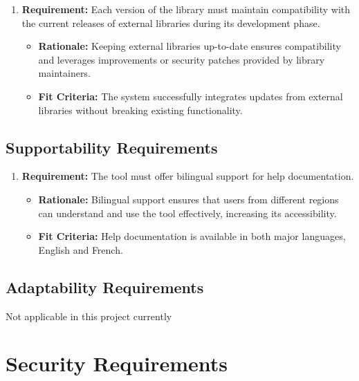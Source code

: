 \documentclass[12pt]{article}
\begin{document}
\begin{enumerate}
  \item \textbf{Requirement:} Each version of the library must maintain compatibility with the current releases of external libraries during its development phase.
     \begin{itemize}
         \item \textbf{Rationale:} Keeping external libraries up-to-date ensures compatibility and leverages improvements or security patches provided by library maintainers.
         \item \textbf{Fit Criteria:} The system successfully integrates updates from external libraries without breaking existing functionality.
     \end{itemize}
  
  \end{enumerate}

\subsection{Supportability Requirements}
\begin{enumerate}
  \item \textbf{Requirement:} The tool must offer bilingual support for help documentation.
  \begin{itemize}
      \item \textbf{Rationale:} Bilingual support ensures that users from different regions can understand and use the tool effectively, increasing its accessibility.
      \item \textbf{Fit Criteria:} Help documentation is available in both major languages, English and French.
  \end{itemize}
  
\end{enumerate}

\subsection{Adaptability Requirements}
Not applicable in this project currently

\section{Security Requirements}
\end{document}
